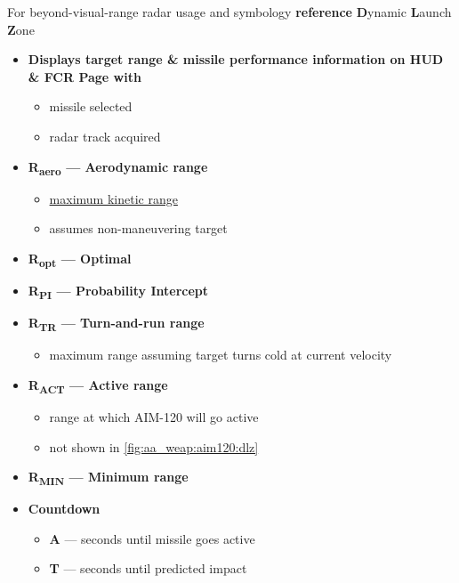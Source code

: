 \begin{tcoloritemize}
    For beyond-visual-range radar usage and symbology \textbf{reference }
    \blueitem[DLZ]
    \textbf{D}ynamic \textbf{L}aunch \textbf{Z}one
    \begin{itemize}
        \item \textbf{Displays target range \& missile performance information on HUD \& FCR Page with}
        \begin{itemize}
            \item missile selected
            \item radar track acquired
        \end{itemize}
        \item \textbf{R\textsubscript{aero} --- Aerodynamic range}
        \begin{itemize}
            \item \underline{maximum kinetic range}
            \item assumes non-maneuvering target
        \end{itemize}
        \item \textbf{R\textsubscript{opt} --- Optimal}
        \item \textbf{R\textsubscript{PI} --- Probability Intercept}
        \item \textbf{R\textsubscript{TR} --- Turn-and-run range}
        \begin{itemize}
            \item maximum range assuming target turns cold at current velocity
        \end{itemize}
        \item \textbf{R\textsubscript{ACT} --- Active range}
        \begin{itemize}
            \item range at which AIM-120 will go active
            \item not shown in \ref{fig:aa_weap:aim120:dlz}
        \end{itemize}
        \item \textbf{R\textsubscript{MIN} --- Minimum range}
        \item \textbf{Countdown}
        \begin{itemize}
            \item \textbf{A} --- seconds until missile goes active
            \item \textbf{T} --- seconds until predicted impact

\end{itemize}
\end{itemize}
\end{tcoloritemize}
